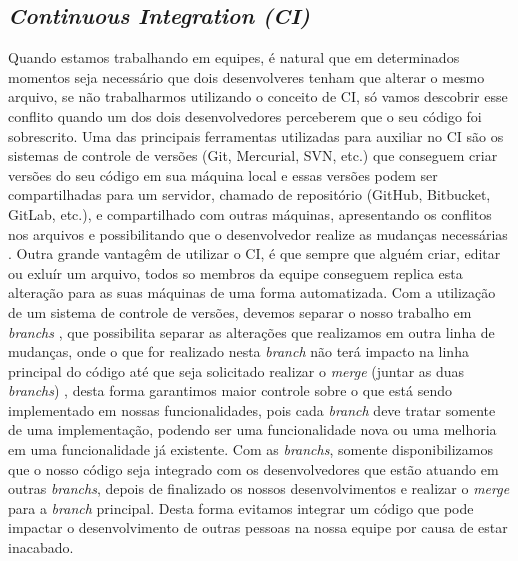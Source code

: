       \subsection{\textit{Continuous Integration (CI)}}
        Quando estamos trabalhando em equipes, é natural que em determinados momentos
        seja necessário que dois desenvolveres tenham que alterar o mesmo arquivo,
        se não trabalharmos utilizando o conceito de CI, só vamos descobrir esse
        conflito quando um dos dois desenvolvedores perceberem que o seu código
        foi sobrescrito. Uma das principais ferramentas utilizadas para auxiliar
        no CI são os sistemas de controle de versões (Git, Mercurial, SVN, etc.)
        que conseguem criar versões do seu código em sua máquina local e essas versões
        podem ser compartilhadas para um servidor, chamado de repositório (GitHub,
        Bitbucket, GitLab, etc.), e compartilhado com outras máquinas, apresentando
        os conflitos nos arquivos e possibilitando que o desenvolvedor realize as
        mudanças necessárias \cite{ProGit}. Outra grande vantagêm de utilizar o CI,
        é que sempre que alguém criar, editar ou exluír um arquivo, todos so membros
        da equipe conseguem replica esta alteração para as suas máquinas de uma forma
        automatizada. \newline
        Com a utilização de um sistema de controle de versões, devemos separar o
        nosso trabalho em \textit{branchs} \cite{TheDevOpsHandbook}, que possibilita
        separar as alterações que realizamos em outra linha de mudanças, onde
        o que for realizado nesta \textit{branch} não terá impacto na linha
        principal do código até que seja solicitado realizar o \textit{merge}
        (juntar as duas \textit{branchs}) \cite{ProGit}, desta forma garantimos maior
        controle sobre o que está sendo implementado em nossas funcionalidades, pois
        cada \textit{branch} deve tratar somente de uma implementação, podendo ser
        uma funcionalidade nova ou uma melhoria em uma funcionalidade já existente.
        Com as \textit{branchs}, somente disponibilizamos que o nosso código seja
        integrado com os desenvolvedores que estão atuando em outras \textit{branchs},
        depois de finalizado os nossos desenvolvimentos e realizar o \textit{merge}
        para a \textit{branch} principal. Desta forma evitamos integrar um código
        que pode impactar o desenvolvimento de outras pessoas na nossa equipe por
        causa de estar inacabado. \newline

